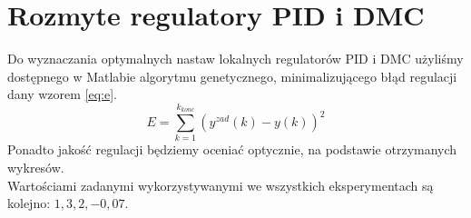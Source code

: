 \chapter{Rozmyte regulatory PID i DMC}
Do wyznaczania optymalnych nastaw lokalnych regulatorów PID i DMC użyliśmy dostępnego w Matlabie algorytmu genetycznego, minimalizującego błąd regulacji dany wzorem \ref{eq:e}.
\begin{equation} \label{eq:e}
E = \sum_{k=1}^{k_{konc}} (y^{zad}(k)-y(k))^2
\end{equation}
Ponadto jakość regulacji będziemy oceniać optycznie, na podstawie otrzymanych wykresów. \\
Wartościami zadanymi wykorzystywanymi we wszystkich eksperymentach są kolejno: $1,3,2,-0,07$.



